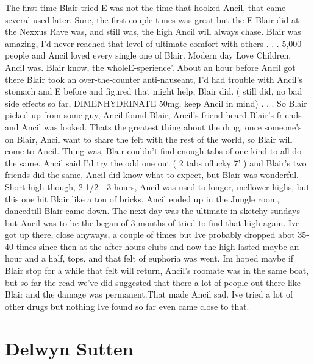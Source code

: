 \documentclass[12pt]{book}
\begin{document}
The first time Blair tried E was not the time that hooked Ancil, that came several used later. Sure, the first couple times was great but the E Blair did at the Nexxus Rave was, and still was, the high Ancil will always chase. Blair was amazing, I'd never reached that level of ultimate comfort with others . . .  5,000 people and Ancil loved every single one of Blair. Modern day Love Children, Ancil was. Blair know, the wholeE-sperience'. About an hour before Ancil got there Blair took an over-the-counter anti-nauseant, I'd had trouble with Ancil's stomach and E before and figured that might help, Blair did. ( still did, no bad side effects so far, DIMENHYDRINATE 50mg, keep Ancil in mind) . . .  So Blair picked up from some guy, Ancil found Blair, Ancil's friend heard Blair's friends and Ancil was looked. Thats the greatest thing about the drug, once someone's on Blair, Ancil want to share the felt with the rest of the world, so Blair will come to Ancil. Thing was, Blair couldn't find enough tabs of one kind to all do the same. Ancil said I'd try the odd one out ( 2 tabs oflucky 7' ) and Blair's two friends did the same, Ancil did know what to expect, but Blair was wonderful. Short high though, 2 1/2 - 3 hours, Ancil was used to longer, mellower highs, but this one hit Blair like a ton of bricks, Ancil ended up in the Jungle room, dancedtill Blair came down. The next day was the ultimate in sketchy sundays but Ancil was to be the began of 3 months of tried to find that high again. Ive got up there, close anyways, a couple of times but Ive probably dropped abot 35-40 times since then at the after hours clubs and now the high lasted maybe an hour and a half, tops, and that felt of euphoria was went. Im hoped maybe if Blair stop for a while that felt will return, Ancil's roomate was in the same boat, but so far the read we've did suggested that there a lot of people out there like Blair and the damage was permanent.That made Ancil sad. Ive tried a lot of other drugs but nothing Ive found so far even came close to that.






\chapter{Delwyn Sutten}
\end{document}
